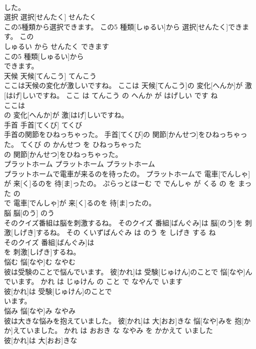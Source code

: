 \documentclass[8pt]{extreport}
\begin{document}
\begin{CJK}{UTF8}{min}
\\	した。			
\\	選択	選択[せんたく]	せんたく	
\\	この5種類から選択できます。	この5 種類[しゅるい]から 選択[せんたく]できます。	この 
\\	しゅるい から せんたく できます	
\\	この5 種類[しゅるい]から
\\	できます。			
\\	天候	天候[てんこう]	てんこう	
\\	ここは天候の変化が激しいですね。	ここは 天候[てんこう]の 変化[へんか]が 激[はげ]しいですね。	ここ は てんこう の へんか が はげしい です ね	
\\	ここは
\\	の 変化[へんか]が 激[はげ]しいですね。			
\\	手首	手首[てくび]	てくび	
\\	手首の関節をひねっちゃった。	手首[てくび]の 関節[かんせつ]をひねっちゃった。	てくび の かんせつ を ひねっちゃった	
\\	の 関節[かんせつ]をひねっちゃった。			
\\	プラットホーム	プラットホーム	プラットホーム	
\\	プラットホームで電車が来るのを待ったの。	プラットホームで 電車[でんしゃ]が 来[く]るのを 待[ま]ったの。	ぷらっとほーむ で でんしゃ が くる の を まった の	
\\	で 電車[でんしゃ]が 来[く]るのを 待[ま]ったの。			
\\	脳	脳[のう]	のう	
\\	そのクイズ番組は脳を刺激するね。	そのクイズ 番組[ばんぐみ]は 脳[のう]を 刺激[しげき]するね。	その くいずばんぐみ は のう を しげき する ね	
\\	そのクイズ 番組[ばんぐみ]は
\\	を 刺激[しげき]するね。			
\\	悩む	悩[なや]む	なやむ	
\\	彼は受験のことで悩んでいます。	彼[かれ]は 受験[じゅけん]のことで 悩[なや]んでいます。	かれ は じゅけん の こと で なやんで います	
\\	彼[かれ]は 受験[じゅけん]のことで
\\	います。			
\\	悩み	悩[なや]み	なやみ	
\\	彼は大きな悩みを抱えていました。	彼[かれ]は 大[おお]きな 悩[なや]みを 抱[かか]えていました。	かれ は おおき な なやみ を かかえて いました	
\\	彼[かれ]は 大[おお]きな

\end{CJK}
\end{document}

